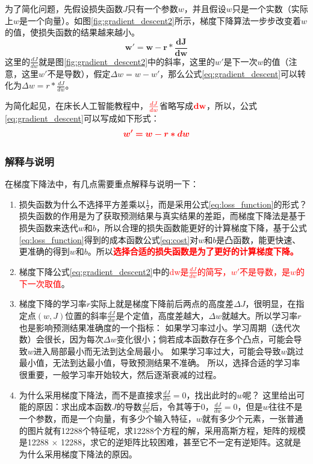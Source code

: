 为了简化问题，先假设损失函数$J$只有一个参数$w$，并且假设$w$只是一个实数（实际上$w$是一个向量）。如图\ref{fig:gradient_descent2}所示，梯度下降算法一步步改变着$w$的值，使损失函数的结果越来越小。
\begin{equation}
	\bm{w' = w - r * \frac{dJ}{dw}} \label{eq:gradient_descent}
\end{equation}
这里的$\frac{dJ}{dw}$就是图\ref{fig:gradient_descent2}中的斜率，这里的$w'$是下一次$w$的值（注意，这里$w'$不是导数），假定$\Delta w = w - w'$，那么公式\ref{eq:gradient_descent}可以转化为$\Delta w = r * \frac{dJ}{dw}$。

为简化起见，在床长人工智能教程中，$\textcolor{red}{\textbf{$\frac{dJ}{dw}$}}$省略写成$\textcolor{red}{\textbf{dw}}$，所以，公式\ref{eq:gradient_descent}可以写成如下形式：
\begin{equation}
	\textcolor{red}{\bm{w' = w - r * dw} \label{eq:gradient_descent2}}
\end{equation}

\subsubsection{解释与说明}
在梯度下降法中，有几点需要重点解释与说明一下：
\begin{enumerate}
	\item 损失函数为什么不选择平方差乘以$\frac{1}{2}$，而是采用公式\ref{eq:loss_function}的形式？
	损失函数的作用是为了获取预测结果与真实结果的差距，而梯度下降法是基于损失函数来迭代$w$和$b$，所以合理的损失函数能更好的计算梯度下降，基于公式\ref{eq:loss_function}得到的成本函数公式\ref{eq:cost}对$w$和$b$是凸函数，能更快速、更准确的得到$w$和$b$。所以\textcolor{red}{\textbf{选择合适的损失函数是为了更好的计算梯度下降。}}
	
	\item 梯度下降公式\ref{eq:gradient_descent2}中的\textcolor{red}{dw是$\frac{dJ}{dw}$的简写，$w'$不是导数，是$w$的下一次取值}。
	
	\item 梯度下降的学习率$r$实际上就是梯度下降前后两点的高度差$\Delta J$，很明显，在指定点$(w,J)$位置的斜率$\frac{dJ}{dw}$是个定值，高度差越大，$\Delta w$就越大。所以学习率$r$也是影响预测结果准确度的一个指标：
	如果学习率过小。学习周期（迭代次数）会很长，因为每次$\Delta w$变化很小；倘若成本函数存在多个凸点，可能会导致$w$进入局部最小而无法到达全局最小。
	如果学习率过大，可能会导致$w$跳过最小值，无法到达最小值，导致预测结果不准确。
	所以，选择合适的学习率很重要，一般学习率开始较大，然后逐渐衰减的过程。
	
	\item 为什么采用梯度下降法，而不是直接求$\frac{dJ}{dw} = 0$，找出此时的$w$呢？
	这里给出可能的原因：求出成本函数$J$的导数$\frac{dJ}{dw}$后，令其等于0，$\frac{dJ}{dw} = 0$，但是$w$往往不是一个参数，而是一个向量，有多少个输入特征，$w$就有多少个元素，一张普通的图片就有12288个特征呢，求12288个方程的解，采用高斯方程，矩阵的规模是12288 $\times$ 12288，求它的逆矩阵比较困难，甚至它不一定有逆矩阵。这就是为什么采用梯度下降法的原因。
\end{enumerate}


